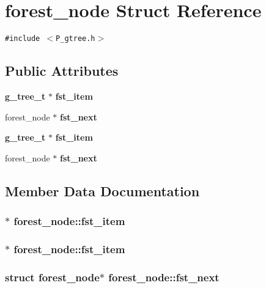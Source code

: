 \section{forest\_\-node  Struct Reference}
\label{structforest__node}
{\tt \#include $<$P\_\-gtree.h$>$}

\subsection*{Public Attributes}
\begin{CompactItemize}
\item 
{\bf g\_\-tree\_\-t} $\ast$ {\bf fst\_\-item}
\item 
forest\_\-node $\ast$ {\bf fst\_\-next}
\item 
{\bf g\_\-tree\_\-t} $\ast$ {\bf fst\_\-item}
\item 
forest\_\-node $\ast$ {\bf fst\_\-next}
\end{CompactItemize}


\subsection{Member Data Documentation}
\subsubsection{$\ast$ forest\_\-node::fst\_\-item}\label{structforest__node_m2}


\subsubsection{$\ast$ forest\_\-node::fst\_\-item}\label{structforest__node_m0}


\subsubsection{\setlength{\rightskip}{0pt plus 5cm}struct forest\_\-node$\ast$ forest\_\-node::fst\_\-next}\label{structforest__node_m3}


